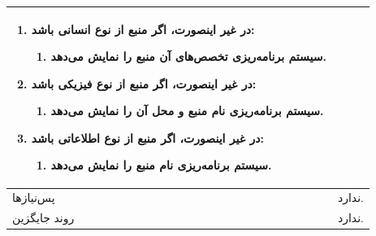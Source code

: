 \begin{table}[H]
\begin{tabular}{|p{3cm}|p{10cm}|}
\begin{enumerate}[topsep=0cm,leftmargin=0.5cm]
\begin{enumerate}[topsep=0cm,leftmargin=0.5cm]
				\item در غیر اینصورت، اگر منبع از نوع انسانی باشد:
				\begin{enumerate}[topsep=0cm,leftmargin=0.5cm]
					\item سیستم برنامه‌ریزی تخصص‌های آن منبع را نمایش می‌دهد.
				\end{enumerate}
				\item در غیر اینصورت، اگر منبع از نوع فیزیکی باشد:
				\begin{enumerate}[topsep=0cm,leftmargin=0.5cm]
					\item سیستم برنامه‌ریزی نام منبع و محل آن را نمایش می‌دهد.
				\end{enumerate}
				\item در غیر اینصورت، اگر منبع از نوع اطلاعاتی باشد:
				\begin{enumerate}[topsep=0cm,leftmargin=0.5cm]
					\item سیستم برنامه‌ریزی نام منبع را نمایش می‌دهد.
				\end{enumerate}
			\end{enumerate}
			
		\end{enumerate} \\
		
		\hline
		پس‌نیازها & ندارد. \\
		\hline
		روند جایگزین & ندارد. \\
		\hline
	\end{tabular}
\end{table}


